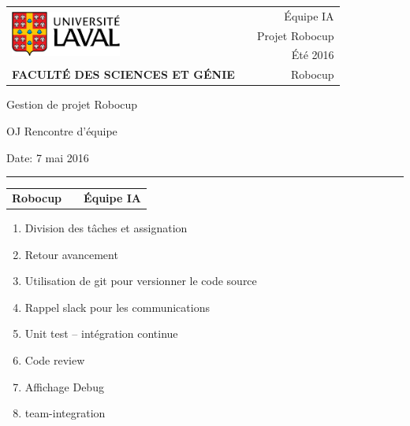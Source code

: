 \documentclass[12pt,letterpaper,twoside]{article}
\begin{document}
\setcounter{secnumdepth}{0}
\begin{titlepage}

	\vspace*{1cm}
	\begin{small}
		\begin{tabularx}{\textwidth}{ l X r }
			\multirow{3}{*}{\includegraphics[height=1.5cm,keepaspectratio]{ul_logo.pdf}}
			&& \'Equipe IA\\
   && Projet Robocup\\
   && Été 2016\\

			\scriptsize{\textbf{FACULTÉ DES SCIENCES ET GÉNIE}} && Robocup
		\end{tabularx}
	\end{small}

	\vfill

	\begin{center}

		Gestion de projet Robocup

		\vspace{0.5cm}

		OJ Rencontre d'\'equipe

		\vspace{2cm}

	\end{center}

	\vfill

	Date: 7 mai 2016

	\vspace{0.4cm}

	\rule{\textwidth}{2pt}

	\vspace{0.3cm}

	\begin{tabularx}{\textwidth}{ l X r }

		\textbf{Robocup} && \textbf{\'Equipe IA} \\

	\end{tabularx}


\end{titlepage}

\begin{enumerate}
	\item Division des tâches et assignation
	\item Retour avancement
	\item Utilisation de git pour versionner le code source
	\item Rappel slack pour les communications
	\item Unit test -- int\'egration continue
    \item Code review
	\item Affichage Debug
	\item team-integration
\end{enumerate}
\end{document}
